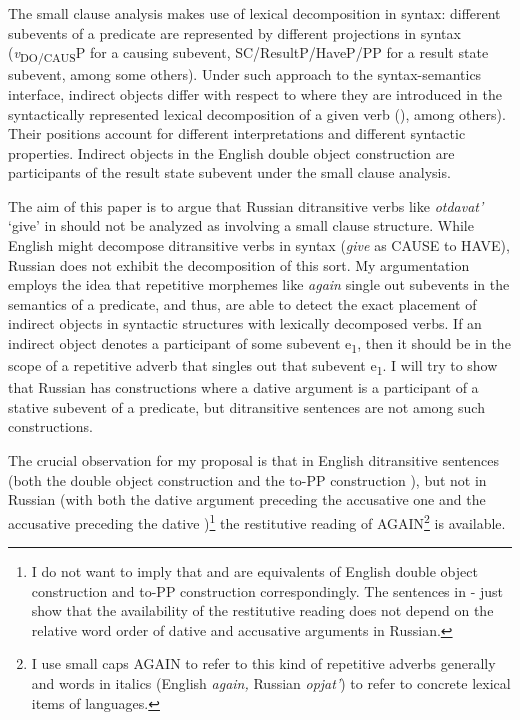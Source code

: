 \documentclass[output=paper,modfonts,nonflat,
 hidelinks
]{langsci/langscibook}
\begin{document}
{The small clause analysis makes use of lexical decomposition in syntax: different subevents of a predicate are represented by different projections in syntax (}{\textit{v}}{\textsubscript{DO/CAUS}}{P for a causing subevent, SC/ResultP/HaveP/PP for a result state subevent, among some others). Under such approach to the syntax-semantics interface, indirect objects differ with respect to where they are introduced in the syntactically represented lexical decomposition of a given verb (\citealt{Cuervo2003,Schäfer2008}), among others). Their positions account for different interpretations and different syntactic properties. Indirect objects in the English double object construction are participants of the result state subevent under the small clause analysis.}



The aim of this paper is to argue that Russian ditransitive verbs like \textit{otdavat’} ‘give’ in  should not be analyzed as involving a small clause structure. While English might decompose ditransitive verbs in syntax (\textit{give} as CAUSE to HAVE), Russian does not exhibit the decomposition of this sort. My argumentation employs the idea that repetitive morphemes like \textit{again} single out subevents in the semantics of a predicate, and thus, are able to detect the exact placement of indirect objects in syntactic structures with lexically decomposed verbs. If an indirect object denotes a participant of some subevent e\textsubscript{1}, then it should be in the scope of a repetitive adverb that singles out that subevent e\textsubscript{1}. I will try to show that Russian has constructions where a dative argument is a participant of a stative subevent of a predicate, but ditransitive sentences are not among such constructions. 



The crucial observation for my proposal is that in English ditransitive sentences (both the double object construction  and the to-PP construction ), but not in Russian (with both the dative argument preceding the accusative one  and the accusative preceding the dative )\footnote{I do not want to imply that  and  are equivalents of English double object construction and to-PP construction correspondingly. The sentences in - just show that the availability of the restitutive reading does not depend on the relative word order of dative and accusative arguments in Russian.} the restitutive reading of AGAIN\footnote{I use small caps AGAIN to refer to this kind of repetitive adverbs generally and words in italics (English \textit{again,} Russian \textit{opjat’}) to refer to concrete lexical items of languages.} is available.
\end{document}
